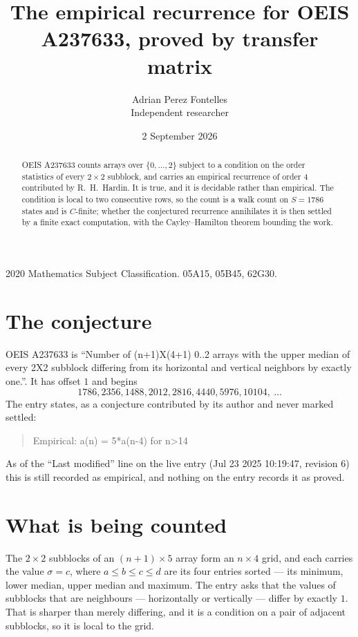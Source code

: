\documentclass[11pt,a4paper]{article}
\title{The empirical recurrence for OEIS A237633, proved by transfer matrix}
\author{Adrian Perez Fontelles\\ \small Independent researcher}
\date{2 September 2026}
\theoremstyle{plain}
\theoremstyle{definition}
\begin{document}
\maketitle

\begin{abstract}
OEIS A237633 counts arrays over $\{0,\dots,2\}$ subject to a condition on the order
statistics of every $2\times2$ subblock, and carries an empirical recurrence of order
$4$ contributed by R.~H.~Hardin. It is true, and it is decidable rather than empirical.
The condition is local to two consecutive rows, so the count is a walk count on $S=1786$
states and is $C$-finite; whether the conjectured recurrence annihilates it is then settled by
a finite exact computation, with the Cayley--Hamilton theorem bounding the work.
\end{abstract}

\noindent\small 2020 Mathematics Subject Classification. 05A15, 05B45, 62G30.\normalsize

\section{The conjecture}

OEIS A237633 is ``Number of (n+1)X(4+1) 0..2 arrays with the upper median of every 2X2 subblock differing from its horizontal and vertical neighbors by exactly one.''. It has offset $1$ and begins
\[
1786, 2356, 1488, 2012, 2816, 4440, 5976, 10104,\ \dots
\]
The entry states, as a conjecture contributed by its author and never marked settled:
\begin{quote}
Empirical: a(n) = 5*a(n-4) for n>14
\end{quote}
As of the ``Last modified'' line on the live entry (Jul 23 2025 10:19:47, revision 6) this is still
recorded as empirical, and nothing on the entry records it as proved.

\section{What is being counted}

The $2\times2$ subblocks of an $(n+1)\times5$ array form an
$n\times4$ grid, and each carries the value $\sigma=c$, where $a\le b\le c\le d$ are its four entries sorted --- its minimum, lower median, upper median and maximum. The entry asks that the values of
subblocks that are neighbours --- horizontally or vertically --- differ by exactly $1$.
That is sharper than merely differing, and it is a condition on a pair of adjacent subblocks,
so it is local to the grid.
\end{document}

